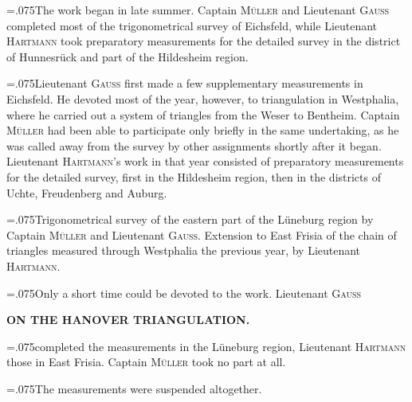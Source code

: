 {\hangindent=.075\linewidth{}\noindent{}The work began in late summer. Captain \textsc{Müller} and Lieutenant \textsc{Gauss} completed most of the trigonometrical survey of Eichsfeld, while Lieutenant \textsc{Hartmann} took preparatory measurements for the detailed survey in the district of Hunnesrück and part of the Hildesheim region.\par}

{\hangindent=.075\linewidth{}\noindent{}\enspace Lieutenant \textsc{Gauss} first made a few supplementary measurements in Eichsfeld. He devoted most of the year, however, to triangulation in Westphalia, where he carried out a system of triangles from the Weser to Bentheim. Captain \textsc{Müller} had been able to participate only briefly in the same undertaking, as he was called away from the survey by other assignments shortly after it began. Lieutenant \textsc{Hartmann}'s work in that year consisted of preparatory measurements for the detailed survey, first in the Hildesheim region, then in the districts of Uchte, Freudenberg and Auburg.\par}

{\hangindent=.075\linewidth{}\noindent{}\enspace Trigonometrical survey of the eastern part of the Lüneburg region by Captain \textsc{Müller} and Lieutenant \textsc{Gauss}. Extension to East Frisia of the chain of triangles measured through Westphalia the previous year, by Lieutenant \textsc{Hartmann}.\par}

{\hangindent=.075\linewidth{}\noindent{}Only a short time could be devoted to the work. Lieutenant \textsc{Gauss}\par}

\par\clearpage
\noindent\null\hfill{\small\textbf{ON THE HANOVER TRIANGULATION.}}\hfill{}\par\medskip

{\leftskip=.075\linewidth\noindent completed the measurements in the Lüneburg region, Lieutenant \textsc{Hartmann} those in East Frisia. Captain \textsc{Müller} took no part at all.\par}

{\hangindent=.075\linewidth{}\noindent{}The measurements were suspended altogether.\par}

